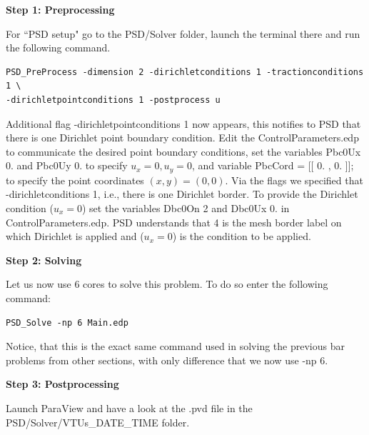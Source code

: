 \textbf{Step 1: Preprocessing}

For ``PSD setup" go to the {\ttfamily PSD/Solver} folder, launch the terminal there and run the following command.
\begin{lstlisting}[style=Linux]
PSD_PreProcess -dimension 2 -dirichletconditions 1 -tractionconditions 1 \ 
-dirichletpointconditions 1 -postprocess u
\end{lstlisting}

Additional flag {\ttfamily -dirichletpointconditions 1} now appears, this notifies to PSD that there is one Dirichlet point boundary condition. Edit the  {\ttfamily ControlParameters.edp} to communicate the desired point boundary conditions, set the variables {\ttfamily Pbc0Ux  0.} and {\ttfamily Pbc0Uy  0.} to specify $u_x=0,u_y=0$, and variable {\ttfamily PbcCord = [[  0. , 0. ]];} to specify the point coordinates $(x,y)=(0,0)$. Via the flags we specified that {\ttfamily -dirichletconditions 1}, i.e., there is one Dirichlet border.
To provide the Dirichlet condition ($u_x=0$) set the variables {\ttfamily Dbc0On 2} and {\ttfamily Dbc0Ux 0.}  in {\ttfamily ControlParameters.edp}. PSD understands that 4 is the mesh border label on which Dirichlet is applied and ($u_x=0$) is the condition to be applied.

\textbf{Step 2: Solving}

Let us now use 6 cores to solve this problem. To do so enter the following command:

\begin{lstlisting}[style=Linux]
PSD_Solve -np 6 Main.edp
\end{lstlisting}
%
Notice, that this is the exact same command used in solving the previous bar problems from other sections, with only difference that we now use {\ttfamily -np 6}.


\textbf{Step 3: Postprocessing}

Launch ParaView and have a look at the  {\ttfamily .pvd} file in the  {\ttfamily PSD/Solver/VTUs\_DATE\_TIME} folder. 

